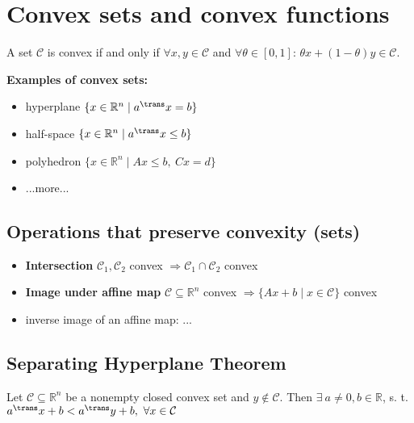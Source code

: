 \section{Convex sets and convex functions}

\begin{definition}
	A set $\mathcal{C}$ is convex if and only if
	$\forall x,y \in \mathcal{C}$ and
	$\forall \theta \in [0,1]$: \quad
	$\theta x + (1-\theta)y \in \mathcal{C}$.
\end{definition}


\textbf{Examples of convex sets:}
\begin{itemize}
	\item
	      hyperplane $\{x \in \mathbb{R}^n \mid a^{\trans}x=b\}$
	\item
	      half-space $\{x \in \mathbb{R}^n \mid a^{\trans}x\le b\}$
	\item
	      polyhedron $\{x \in \mathbb{R}^n \mid Ax \le b ,\ Cx = d\}$
	\item
	      ...more...

\end{itemize}

\subsection{Operations that preserve convexity (sets)}

\begin{itemize}
	\item \textbf{Intersection}
	      $\mathcal{C}_1, \mathcal{C}_2$ convex $\Rightarrow \mathcal{C}_1 \cap \mathcal{C}_2$ convex
	\item \textbf{Image under affine map}
	      $\mathcal{C} \subseteq  \mathbb{R}^{n}$ convex
	      $\Rightarrow \{Ax+b \mid x \in \mathcal{C} \}$ convex
	\item inverse image of an affine map:
	      ...
\end{itemize}

\subsection{Separating Hyperplane Theorem}
\begin{theorem}
	Let $\mathcal{C} \subseteq  \mathbb{R}^{n}$ be a nonempty closed convex set and $y \notin \mathcal{C}$.
	Then $\exists\ a \ne 0, b \in \mathbb{R}$,
	s. t. $a^{\trans} x + b < a^{\trans} y + b,\ \forall x \in \mathcal{C}$
\end{theorem}

